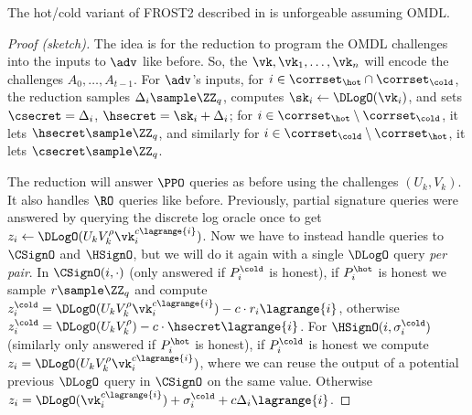 \begin{theorem}
    The hot/cold variant of FROST2 described in  is unforgeable assuming OMDL.
\end{theorem}
\begin{proof}[Proof (sketch)]
The idea is for the reduction to program the OMDL challenges into the inputs to $\adv$ like before. So, the $\vk, \vk_1, \dots, \vk_n$ will encode the challenges $A_0, \dots, A_{t-1}$. For $\adv$'s inputs, for $i \in \corrset_\hot \cap \corrset_\cold$, the reduction samples $\Delta_i \sample \ZZ_q$, computes $\sk_i \gets \DLogO(\vk_i)$, and sets $\csecret = \Delta_i$, $\hsecret = \sk_i + \Delta_i$; for $i \in \corrset_\hot \setminus \corrset_\cold$, it lets $\hsecret \sample \ZZ_q$, and similarly for $i \in \corrset_\cold \setminus \corrset_\hot$, it lets $\csecret \sample \ZZ_q$.

The reduction will answer $\PPO$ queries as before using the challenges $(U_k,V_k)$. It also handles $\RO$ queries like before. Previously, partial signature queries were answered by querying the discrete log oracle once to get $z_i \gets \DLogO(U_k V_k^\rho \vk_i^{c \lagrange{i}})$. Now we have to instead handle queries to $\CSignO$ and $\HSignO$, but we will do it again with a single $\DLogO$ query \emph{per pair}. In $\CSignO(i, \cdot)$ (only answered if $P_i^\cold$ is honest), if $P_i^\hot$ is honest we sample $r \sample \ZZ_q$ and compute $z_i^\cold = \DLogO(U_k V_k^\rho \vk_i^{c \lagrange{i}}) - c \cdot r_i \lagrange{i}$, otherwise $z_i^\cold = \DLogO(U_k V_k^\rho) - c \cdot \hsecret \lagrange{i}$. For $\HSignO(i, \sigma_i^\cold)$ (similarly only answered if $P_i^\hot$ is honest), if $P_i^\cold$ is honest we compute $z_i = \DLogO(U_k V_k^\rho \vk_i^{c \lagrange{i}})$, where we can reuse the output of a potential previous $\DLogO$ query in $\CSignO$ on the same value. Otherwise $z_i = \DLogO(\vk_i^{c \lagrange{i}}) + \sigma_i^\cold + c \Delta_i \lagrange{i}$.


\end{proof}
